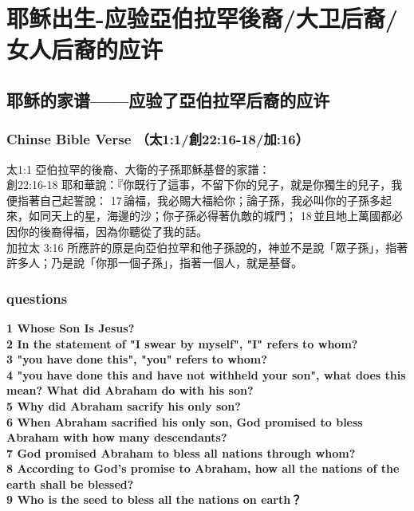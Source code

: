 \chapter{耶稣出生-应验亞伯拉罕後裔/大卫后裔/女人后裔的应许}

\section{耶稣的家谱——应验了亞伯拉罕后裔的应许}
\subsection{Chinse Bible Verse （太1:1/創22:16-18/加:16）}
太1:1 亞伯拉罕的後裔、大衛的子孫耶穌基督的家譜：\\
創22:16-18 耶和華說：『你既行了這事，不留下你的兒子，就是你獨生的兒子，我便指著自己起誓說： 17 論福，我必賜大福給你；論子孫，我必叫你的子孫多起來，如同天上的星，海邊的沙；你子孫必得著仇敵的城門； 18 並且地上萬國都必因你的後裔得福，因為你聽從了我的話。\\
加拉太 3:16 所應許的原是向亞伯拉罕和他子孫說的，神並不是說「眾子孫」，指著許多人；乃是說「你那一個子孫」，指著一個人，就是基督。


\subsection{questions}
\textbf{1 Whose Son Is Jesus?}\\
\textbf{2 In the statement of "I swear by myself", "I" refers to whom?}\\
\textbf{3 "you have done this", "you" refers to whom?}\\
\textbf{4 "you have done this and have not withheld your son", what does this mean? What did Abraham do with his son?}\\
\textbf{5 Why did Abraham sacrify his only son?}\\
\textbf{6 When Abraham sacrified his only son, God promised to bless Abraham with how many descendants?}\\
\textbf{7 God promised Abraham to bless all nations through whom?}\\
\textbf{8 According to God's promise to Abraham, how all the nations of the earth shall be blessed?}\\
\textbf{9 Who is the seed to bless all the nations on earth？}\\



